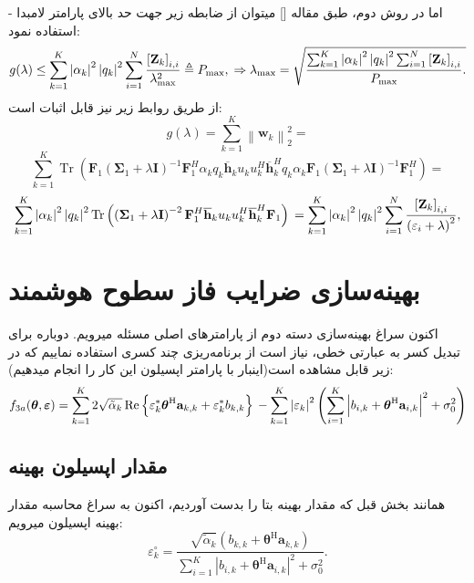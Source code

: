 - اما در روش دوم، طبق مقاله [] میتوان از ضابطه زیر جهت حد بالای پارامتر لامبدا استفاده نمود:
\[
	g(\lambda) \leq \sum_{k=1}^{K}\left|\alpha_{k}\right|^{2}\left|q_{k}\right|^{2} \sum_{i=1}^{N} \frac{\left[\mathbf{Z}_{k}\right]_{i, i}}{\lambda_{\max }^{2}} \triangleq P_{\max }, \\
	\Rightarrow \lambda_{\max }=\sqrt{\frac{\sum_{k=1}^{K}\left|\alpha_{k}\right|^{2}\left|q_{k}\right|^{2} \sum_{i=1}^{N}\left[\mathbf{Z}_{k}\right]_{i, i}}{P_{\max }} .}
\]
از طریق روابط زیر نیز قابل اثبات است:
\[
	g(\lambda)  =\sum_{k=1}^{K}\left\|\mathbf{w}_{k}\right\|_{2}^{2}=
\]
\[
\sum_{k=1}^{K} \operatorname{Tr}\left(\mathbf{F}_{1}\left(\boldsymbol{\Sigma}_{1}+\lambda \mathbf{I}\right)^{-1} \mathbf{F}_{1}^{H} \alpha_{k} q_{k} \overline{\mathbf{h}}_{k} u_{k} u_{k}^{H} \overline{\mathbf{h}}_{k}^{H} q_{k} \alpha_{k} \mathbf{F}_{1}\left(\boldsymbol{\Sigma}_{1}+\lambda \mathbf{I}\right)^{-1} \mathbf{F}_{1}^{H}\right)=
\]
\[
	 \sum_{k=1}^{K}\left|\alpha_{k}\right|^{2}\left|q_{k}\right|^{2} \operatorname{Tr}\left(\left(\boldsymbol{\Sigma}_{1}+\lambda \mathbf{I}\right)^{-2} \mathbf{F}_{1}^{H} \overline{\mathbf{h}}_{k} u_{k} u_{k}^{H} \overline{\mathbf{h}}_{k}^{H} \mathbf{F}_{1}\right) \\
	 =\sum_{k=1}^{K}\left|\alpha_{k}\right|^{2}\left|q_{k}\right|^{2} \sum_{i=1}^{N} \frac{\left[\mathbf{Z}_{k}\right]_{i, i}}{\left(\varepsilon_{i}+\lambda\right)^{2}},
\]
\section{بهینه‌سازی ضرایب فاز سطوح هوشمند}
اکنون سراغ بهینه‌سازی دسته دوم از پارامترهای اصلی مسئله میرویم. دوباره برای تبدیل کسر به عبارتی خطی، نیاز است از برنامه‌ریزی چند کسری استفاده نماییم که در زیر قابل مشاهده است(اینبار با پارامتر اپسیلون این کار را انجام میدهیم):
\[
	f_{3 a}(\boldsymbol{\theta}, \boldsymbol{\varepsilon})=  \sum_{k=1}^{K} 2 \sqrt{\tilde{\alpha}_{k}} \operatorname{Re}\left\{\varepsilon_{k}^{*} \boldsymbol{\theta}^{\mathrm{H}} \mathbf{a}_{k, k}+\varepsilon_{k}^{*} b_{k, k}\right\} \\
	 -\sum_{k=1}^{K}\left|\varepsilon_{k}\right|^{2}\left(\sum_{i=1}^{K}\left|b_{i, k}+\boldsymbol{\theta}^{\mathrm{H}} \mathbf{a}_{i, k}\right|^{2}+\sigma_{0}^{2}\right)
\]

\subsection{مقدار اپسیلون بهینه}
همانند بخش قبل که مقدار بهینه بتا را بدست آوردیم، اکنون به سراغ محاسبه مقدار بهینه اپسیلون میرویم:\
\[
\varepsilon_{k}^{\circ}=\frac{\sqrt{\tilde{\alpha}_{k}}\left(b_{k, k}+\boldsymbol{\theta}^{\mathrm{H}} \mathbf{a}_{k, k}\right)}{\sum_{i=1}^{K}\left|b_{i, k}+\boldsymbol{\theta}^{\mathrm{H}} \mathbf{a}_{i, k}\right|^{2}+\sigma_{0}^{2}} .
\]
\newpage
